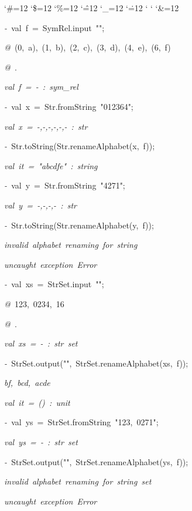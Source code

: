 \begin{list}{}
{\setlength{\leftmargin}{\leftmargini}
\setlength{\rightmargin}{0cm}
\setlength{\itemindent}{0cm}
\setlength{\listparindent}{0cm}
\setlength{\itemsep}{0cm}
\setlength{\parsep}{0cm}
\setlength{\labelsep}{0cm}
\setlength{\labelwidth}{0cm}
\catcode`\#=12
\catcode`\$=12
\catcode`\%=12
\catcode`\^=12
\catcode`\_=12
\catcode`\.=12
\catcode`
\catcode`
\catcode`\&=12
\ttfamily}
\small
\item[]\textsl{-\ }val\ f\ =\ SymRel.input\ "";
\item[]\textsl{@\ }(0,\ a),\ (1,\ b),\ (2,\ c),\ (3,\ d),\ (4,\ e),\ (6,\ f)
\item[]\textsl{@\ }.
\item[]\textsl{val\ f\ =\ -\ :\ sym_rel}
\item[]\textsl{-\ }val\ x\ =\ Str.fromString\ "012364";
\item[]\textsl{val\ x\ =\ -,-,-,-,-,-\ :\ str}
\item[]\textsl{-\ }Str.toString(Str.renameAlphabet(x,\ f));
\item[]\textsl{val\ it\ =\ "abcdfe"\ :\ string}
\item[]\textsl{-\ }val\ y\ =\ Str.fromString\ "4271";
\item[]\textsl{val\ y\ =\ -,-,-,-\ :\ str}
\item[]\textsl{-\ }Str.toString(Str.renameAlphabet(y,\ f));
\item[]\textsl{invalid\ alphabet\ renaming\ for\ string}
\item[]
\item[]\textsl{uncaught\ exception\ Error}
\item[]\textsl{-\ }val\ xs\ =\ StrSet.input\ "";
\item[]\textsl{@\ }123,\ 0234,\ 16
\item[]\textsl{@\ }.
\item[]\textsl{val\ xs\ =\ -\ :\ str\ set}
\item[]\textsl{-\ }StrSet.output("",\ StrSet.renameAlphabet(xs,\ f));
\item[]\textsl{bf,\ bcd,\ acde}
\item[]\textsl{val\ it\ =\ ()\ :\ unit}
\item[]\textsl{-\ }val\ ys\ =\ StrSet.fromString\ "123,\ 0271";
\item[]\textsl{val\ ys\ =\ -\ :\ str\ set}
\item[]\textsl{-\ }StrSet.output("",\ StrSet.renameAlphabet(ys,\ f));
\item[]\textsl{invalid\ alphabet\ renaming\ for\ string\ set}
\item[]
\item[]\textsl{uncaught\ exception\ Error}
\end{list}
